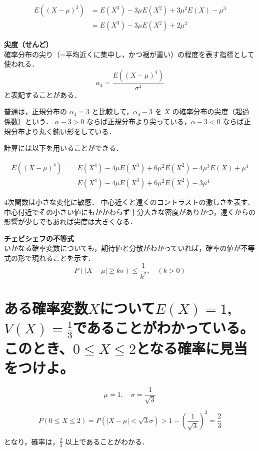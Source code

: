 \documentclass[titlepage,a4paper]{jsarticle}
\begin{document}
\begin{align*}
  E((X - \mu)^3) & = E(X^3) - 3\mu E(X^2) + 3\mu^2 E(X) - \mu^3 \\
                 & = E(X^3) - 3\mu E(X^2) + 2\mu^3
\end{align*}

\textbf{尖度（せんど）} \\

確率分布の尖り（=平均近くに集中し，かつ裾が重い）の程度を表す指標として使われる．
\[
  \alpha_4 = \frac{E((X - \mu)^4)}{\sigma^4}
\]
と表記することがある．

普通は，正規分布の \(\alpha_4 = 3\) と比較して，\(\alpha_4 - 3\) を \(X\) の確率分布の尖度（超過係数）という．
\(\alpha - 3 > 0\) ならば正規分布より尖っている，\(\alpha - 3 < 0\) ならば正規分布より丸く鈍い形をしている．

計算には以下を用いることができる．

\begin{align*}
  E((X - \mu)^4) & = E(X^4) - 4\mu E(X^3) + 6\mu^2 E(X^2) - 4\mu^3 E(X) + \mu^4 \\
                 & = E(X^4) - 4\mu E(X^3) + 6\mu^2 E(X^2) - 3\mu^4
\end{align*}

4次関数は小さな変化に敏感．
中心近くと遠くのコントラストの激しさを表す．
中心付近でその小さい値にもかかわらず十分大きな密度がありかつ，遠くからの影響が少しでもあれば尖度は大きくなる．

\textbf{チェビシェフの不等式} \\

いかなる確率変数についても，期待値と分散がわかっていれば，確率の値が不等式の形で現れることを示す．
\[
  P(|X - \mu| \geq k\sigma) \leq \frac{1}{k^2}, \quad (k > 0)
\]
\section{ある確率変数$X$について$E(X) = 1$, $V(X) = \frac{1}{3}$であることがわかっている。
  このとき、$0 \leq X \leq 2$となる確率に見当をつけよ。}%
\[
  \mu = 1, \quad \sigma = \frac{1}{\sqrt{3}}
\]

\[
  P(0 \leq X \leq 2) = P(|X - \mu| < \sqrt{3}\sigma) > 1 - \left( \frac{1}{\sqrt{3}} \right)^2 = \frac{2}{3}
\]

となり，確率は，$\frac{2}{3}$ 以上であることがわかる．

\section{ }%
\end{document}
